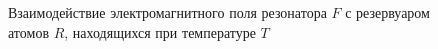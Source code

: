 \begin{figure}
\centering



\caption{Взаимодействие электромагнитного поля резонатора $F$ с
  резервуаром атомов $R$, находящихся при температуре $T$}
\label{figPart1Ch2_7}
\end{figure}
